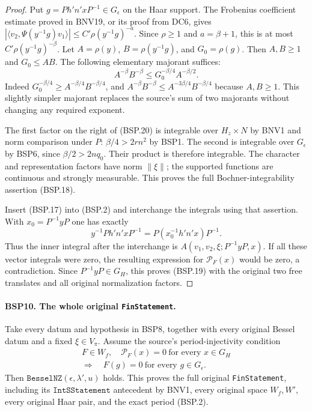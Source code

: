 \begin{proof}
Put $g=P h'n'xP^{-1}\in G_\epsilon$ on the Haar support.
The Frobenius coefficient estimate proved in BNV19, or its proof
from DC6, gives
$|\langle v_2,\Psi(y^{-1}g)v_1\rangle|
       \le C'\rho(y^{-1}g)^{-a}$.
Since $\rho\ge1$ and $a=\beta+1$, this is at most
$C'\rho(y^{-1}g)^{-\beta}$.
Let $A=\rho(y)$, $B=\rho(y^{-1}g)$, and $G_0=\rho(g)$.
Then $A,B\ge1$ and $G_0\le AB$.
The following elementary majorant suffices:
\[
 A^{-\beta}B^{-\beta}
   \le G_0^{-\beta/4}A^{-\beta/2}.
 \tag{BSP.20}
\]
Indeed $G_0^{-\beta/4}\ge A^{-\beta/4}B^{-\beta/4}$,
and $A^{-\beta}B^{-\beta}\le
A^{-3\beta/4}B^{-\beta/4}$ because $A,B\ge1$.
This slightly simpler majorant replaces the source's sum of two
majorants without changing any required exponent.

The first factor on the right of (BSP.20) is integrable over
$H_z\times N$ by BNV1 and norm comparison under $P$:
$\beta/4>2rn^2$ by BSP1.
The second is integrable over $G_\epsilon$ by BSP6, since
$\beta/2>2nq_0$.  Their product is therefore integrable.
The character and representation factors have norm $\|\xi\|$;
the supported functions are continuous and strongly measurable.
This proves the full Bochner-integrability assertion (BSP.18).

Insert (BSP.17) into (BSP.2) and interchange the integrals using
that assertion.  With $x_0=P^{-1}yP$ one has exactly
\[
 y^{-1}P h'n'xP^{-1}
       =P(x_0^{-1}h'n'x)P^{-1}.
\]
Thus the inner integral after the interchange is
$A(v_1,v_2,\xi;P^{-1}yP,x)$.
If all these vector integrals were zero, the resulting expression
for $\mathcal P_F(x)$ would be zero, a contradiction.
Since $P^{-1}yP\in G_H$, this proves (BSP.19) with the original
two free translates and all original normalization factors.
\end{proof}

\paragraph{BSP10. The whole original \texttt{FinStatement}.}
\label{claim:BSP10}
Take every datum and hypothesis in BSP8, together with every original
Bessel datum and a fixed $\xi\in V_\pi$.  Assume the source's
period-injectivity condition
\[
 \begin{gathered}
 F\in W_f,\quad
 \mathcal P_F(x)=0\ \text{for every }x\in G_H\\
 \Longrightarrow\quad F(g)=0\ \text{for every }g\in G_\epsilon.
 \end{gathered}
 \tag{BSP.21}
\]
Then $\texttt{BesselNZ}(\epsilon,\lambda',u)$ holds.
This proves the full original \texttt{FinStatement}, including its
$\texttt{IntSStatement}$ antecedent by BNV1, every original space
$W_f,W'$, every original Haar pair, and the exact period (BSP.2).

